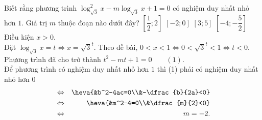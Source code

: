 \begin{ex}%
	Biết rằng phương trình $\log_{\sqrt{3}}^2x-m\log_{\sqrt{3}}x+1=0$ có nghiệm duy nhất nhỏ hơn $1$. Giá trị $m$ thuộc đoạn nào dưới đây?
	\choice
	{$\left[\dfrac{1}{2};2\right]$}
	{\True $[-2;0]$}
	{$[3;5]$}
	{$\left[-4;-\dfrac{5}{2}\right]$}
	\loigiai
	{
		Điều kiện $x>0$.\\
		Đặt $\log_{\sqrt{3}}x=t \Leftrightarrow x=\sqrt{3}^t$.
		Theo đề bài,  $0<x<1 \Leftrightarrow 0<\sqrt{3}^t<1 \Leftrightarrow t<0$.\\
		Phương trình đã cho trở thành $t^2-mt+1=0\qquad(1)$.\\
		Để phương trình có nghiệm duy nhất nhỏ hơn $1$ thì (1) phải có nghiệm duy nhất nhỏ hơn $0$
		\begin{eqnarray*}
			& \Leftrightarrow & \heva{&b^2-4ac=0\\&-\dfrac{b}{2a}<0} \\
			& \Leftrightarrow & \heva{&m^2-4=0\\&\dfrac{m}{2}<0} \\
			& \Leftrightarrow & m=-2.
		\end{eqnarray*}
	}
\end{ex}

